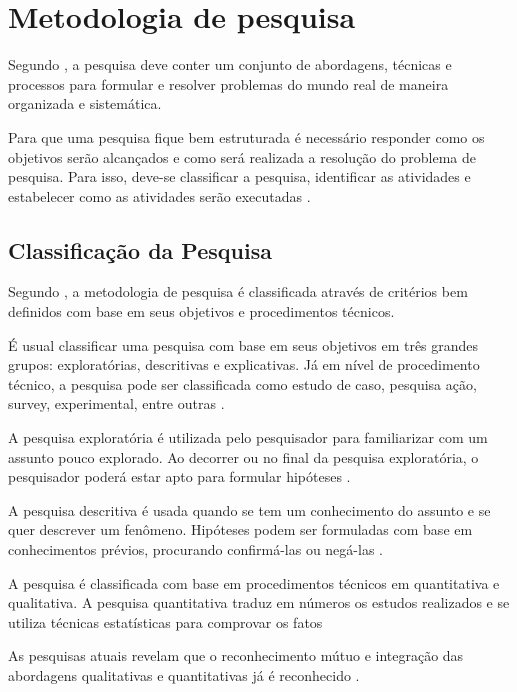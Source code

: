  \chapter{Metodologia de pesquisa}

Segundo , a pesquisa deve conter um conjunto de abordagens, técnicas e processos para formular e resolver problemas do mundo real de maneira organizada e sistemática.

Para que uma pesquisa fique bem estruturada é necessário responder como os objetivos serão alcançados e  como será realizada a resolução do problema de pesquisa. Para isso, deve-se classificar a pesquisa, identificar as atividades e estabelecer como as atividades serão executadas \cite{forcon2014}.

\section{Classificação da Pesquisa}

Segundo , a metodologia de pesquisa é classificada através de critérios bem definidos com base em seus objetivos e procedimentos técnicos.

É usual classificar uma pesquisa com base em seus objetivos em três grandes grupos: exploratórias, descritivas e explicativas. Já em nível de procedimento técnico, a pesquisa pode ser classificada como estudo de caso, pesquisa ação, survey, experimental, entre outras \cite[pág.~41]{gil2008}.

A pesquisa exploratória é utilizada pelo pesquisador para familiarizar com um assunto pouco explorado. Ao decorrer ou no final da pesquisa exploratória, o pesquisador poderá estar apto para formular hipóteses \cite{giudice}.

A pesquisa descritiva é usada quando se tem um conhecimento do assunto e se quer descrever um fenômeno. Hipóteses podem ser formuladas com base em conhecimentos prévios, procurando confirmá-las ou negá-las \cite[pág.~21]{fonseca2002}.

A pesquisa é classificada com base em procedimentos técnicos em quantitativa e qualitativa. A pesquisa quantitativa traduz em números os estudos realizados e se utiliza técnicas estatísticas para comprovar os fatos \cite[pág.~9]{rodrigues2007}


As pesquisas atuais revelam que o reconhecimento mútuo e integração das abordagens qualitativas e quantitativas já é reconhecido \cite{serapioni}.

